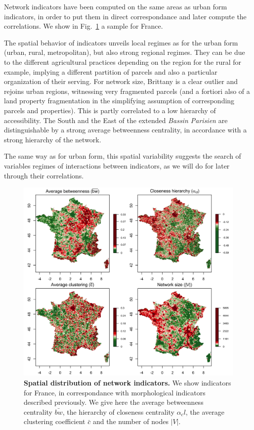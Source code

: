 \documentclass[11pt]{article}
\begin{document}
Network indicators have been computed on the same areas as urban form indicators, in order to put them in direct correspondance and later compute the correlations. We show in Fig.~\ref{fig:staticcorrs:network} a sample for France.

The spatial behavior of indicators unveils local regimes as for the urban form (urban, rural, metropolitan), but also strong regional regimes. They can be due to the different agricultural practices depending on the region for the rural for example, implying a different partition of parcels and also a particular organization of their serving. For network size, Brittany is a clear outlier and rejoins urban regions, witnessing very fragmented parcels (and a fortiori also of a land property fragmentation in the simplifying assumption of corresponding parcels and properties). This is partly correlated to a low hierarchy of accessibility. The South and the East of the extended \emph{Bassin Parisien} are distinguishable by a strong average betweenness centrality, in accordance with a strong hierarchy of the network.

The same way as for urban form, this spatial variability suggests the search of variables regimes of interactions between indicators, as we will do for later through their correlations.

\begin{figure}
\includegraphics[width=\linewidth]{figures/indics_network_en_areasize100_offset50_factor0_5.png}
\caption{\textbf{Spatial distribution of network indicators.} We show indicators for France, in correspondance with morphological indicators described previously. We give here the average betweenness centrality $\bar{bw}$, the hierarchy of closeness centrality $\alpha_cl$, the average clustering coefficient $\bar{c}$ and the number of nodes $\left|V\right|$.\label{fig:staticcorrs:network}}
\end{figure}
\end{document}

